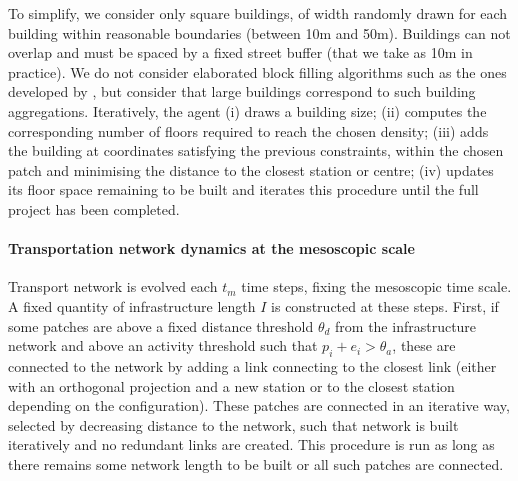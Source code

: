 \documentclass[letterpaper]{article}
\begin{document}
To simplify, we consider only square buildings, of width randomly drawn for each building within reasonable boundaries (between 10m and 50m). Buildings can not overlap and must be spaced by a fixed street buffer (that we take as 10m in practice). We do not consider elaborated block filling algorithms such as the ones developed by \cite{brasebin2017apports}, but consider that large buildings correspond to such building aggregations. Iteratively, the agent (i) draws a building size; (ii) computes the corresponding number of floors required to reach the chosen density; (iii) adds the building at coordinates satisfying the previous constraints, within the chosen patch and minimising the distance to the closest station or centre; (iv) updates its floor space remaining to be built and iterates this procedure until the full project has been completed.


\paragraph{Transportation network dynamics at the mesoscopic scale}

Transport network is evolved each $t_m$ time steps, fixing the mesoscopic time scale. A fixed quantity of infrastructure length $I$ is constructed at these steps. First, if some patches are above a fixed distance threshold $\theta_d$ from the infrastructure network and above an activity threshold such that $p_i + e_i > \theta_a$, these are connected to the network by adding a link connecting to the closest link (either with an orthogonal projection and a new station or to the closest station depending on the configuration). These patches are connected in an iterative way, selected by decreasing distance to the network, such that network is built iteratively and no redundant links are created. This procedure is run as long as there remains some network length to be built or all such patches are connected.

\end{document}
